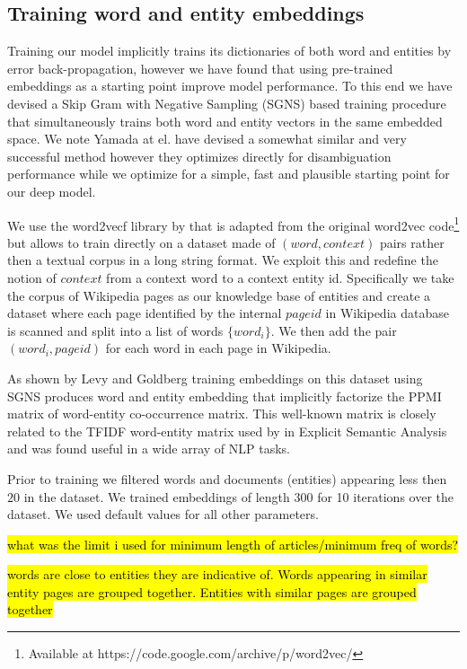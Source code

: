\documentclass[11pt]{article}
\begin{document}
\subsection{Training word and entity embeddings}

Training our model implicitly trains its dictionaries of both word and entities by error back-propagation, however we have found that using pre-trained embeddings as a starting point improve model performance. To this end we have devised a Skip Gram with Negative Sampling (SGNS) \cite{mikolov2013distributed} based training procedure that simultaneously trains both word and entity vectors in the same embedded space. We note Yamada at el. \cite{yamada2016joint} have devised a somewhat similar and very successful method however they optimizes directly for disambiguation performance while we optimize for a simple, fast and plausible starting point for our deep model.

We use the word2vecf library by \cite{levy2014dependency} that is adapted from the original word2vec code\footnote{Available at https://code.google.com/archive/p/word2vec/} but allows to train directly on a dataset made of $(word,context)$ pairs rather then a textual corpus in a long string format. We exploit this and redefine the notion of $context$ from a context word to a context entity id. Specifically we take the corpus of Wikipedia pages as our knowledge base of entities and create a dataset where each page identified by the internal $pageid$ in Wikipedia database is scanned and split into a list of words $\{word_i\}$. We then add the pair $(word_i,pageid)$ for each word in each page in Wikipedia.

As shown by Levy and Goldberg \cite{levy2014neural} training embeddings on this dataset using SGNS produces word and entity embedding that implicitly factorize the PPMI matrix of word-entity co-occurrence matrix. This well-known matrix is closely related to the TFIDF word-entity matrix used by \cite{gabrilovich2007computing} in Explicit Semantic Analysis and was found useful in a wide array of NLP tasks. 

Prior to training we filtered words and documents (entities) appearing less then $20$ in the dataset. We trained embeddings of length 300 for 10 iterations over the dataset. We used default values for all other parameters.

\hl{what was the limit i used for minimum length of articles/minimum freq of words?}

\hl{words are close to entities they are indicative of. Words appearing in similar entity pages are grouped together. Entities with similar pages are grouped together}
\end{document}
